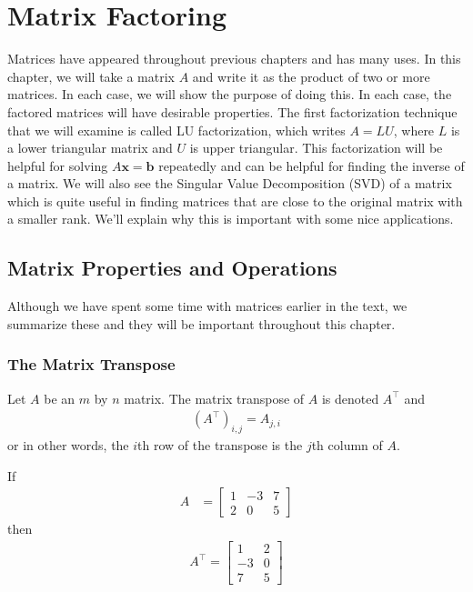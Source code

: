 
\chapter{Matrix Factoring}   \label{ch:matrix:factoring}

Matrices have appeared throughout previous chapters and has many uses.  In this chapter, we will take a matrix $A$ and write it as the product of two or more matrices.  In each case, we will show the purpose of doing this.  In each case, the factored matrices will have desirable properties.  The first factorization technique that we will examine is called LU factorization, which writes $A=LU$, where $L$ is a lower triangular matrix and $U$ is upper triangular.  This factorization will be helpful for solving $A\textbf{x}=\textbf{b}$ repeatedly and can be helpful for finding the inverse of a matrix.   We will also see the Singular Value Decomposition (SVD) of a matrix which is quite useful in finding matrices that are close to the original matrix with a smaller rank.  We'll explain why this is important with some nice applications.  

\section{Matrix Properties and Operations}

Although we have spent some time with matrices earlier in the text, we summarize these and they will be important throughout this chapter. 

\subsection{The Matrix Transpose}

Let $A$ be an $m$ by $n$ matrix.  The matrix transpose of $A$ is denoted $A^{\intercal}$ and 
\begin{align*}
(A^{\intercal})_{i,j} = A_{j,i}
\end{align*}
or in other words, the $i$th row of the transpose is the $j$th column of $A$. 

\begin{example}
If 
\begin{align*}
A & = \begin{bmatrix}
1 & -3 & 7 \\
2 & 0 & 5 
\end{bmatrix}
\end{align*}
then 
\begin{align*}
A^{\intercal} =
\begin{bmatrix}
1 & 2 \\ -3 & 0 \\ 7 & 5
\end{bmatrix}
\end{align*}

\end{example}

